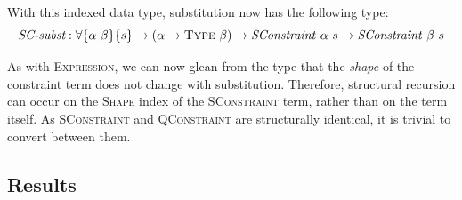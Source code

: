 \documentclass[a4paper]{jfp}
\begin{document}
With this indexed data type, substitution now has the following type:
\begin{displaymath}
   \textit{SC-subst} : \forall \{ \alpha\ \beta \}\{ s \} \rightarrow (\alpha \rightarrow \textsc{Type}\ \beta) 
                     \rightarrow \mathit{SConstraint}\ \alpha\ s \rightarrow \mathit{SConstraint}\ \beta\ s
\end{displaymath}

As with \textsc{Expression}, we can now glean from the type that the \emph{shape} of the constraint term does not change with substitution.
Therefore, structural recursion can occur on the \textsc{Shape} index of the \textsc{SConstraint} term, rather than on the term itself. As
\textsc{SConstraint} and \textsc{QConstraint} are structurally identical, it is trivial to convert between them.

\subsection{Results}
\end{document}
